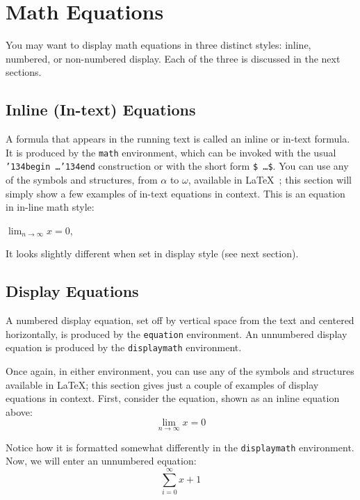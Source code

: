 \section{Math Equations}
You may want to display math equations in three distinct styles: inline, numbered, or non-numbered display. Each of the three is discussed in the next sections.

\subsection{Inline (In-text) Equations}
A formula that appears in the running text is called an inline or in-text formula. It is produced by the \texttt{math} environment, which can be invoked with the usual \texttt{{\char'134}begin\,\ldots{\char'134}end} construction or with the short form \texttt{\$\,\ldots\$}. You can use any of the symbols and structures, from $\alpha$ to $\omega$, available in \LaTeX~\cite{Lamport:LaTeX}; this section will simply show a few examples of in-text equations in context. This is an equation in in-line math style:

\begin{math}
  \lim_{n\rightarrow \infty}x=0
\end{math},

It looks slightly different when set in display style (see next section).

\subsection{Display Equations}
A numbered display equation, set off by vertical space from the text and centered horizontally, is produced by the \texttt{equation} environment. An unnumbered display equation is produced by the \texttt{displaymath} environment.

Once again, in either environment, you can use any of the symbols and structures available in \LaTeX\@; this section gives just a couple of examples of display equations in context. First, consider the equation, shown as an inline equation above:
\begin{equation}
  \lim_{n\rightarrow \infty}x=0
\end{equation}

Notice how it is formatted somewhat differently in the \texttt{displaymath} environment. Now, we will enter an unnumbered equation:
\begin{displaymath}
  \sum_{i=0}^{\infty} x + 1
\end{displaymath}


